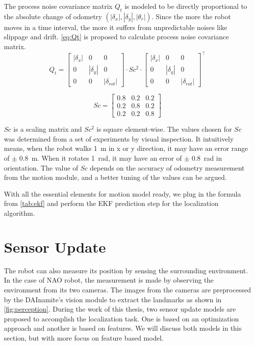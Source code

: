 The process noise covariance matrix $Q_t$ is modeled to be directly proportional to the absolute change of odometry $(|\delta_{x}|, |\delta_{y}|, |\theta_{r}|)$. Since the more the robot moves in a time interval, the more it suffers from unpredictable noises like slippage and drift. \autoref{eq:Qt} is proposed to calculate process noise covariance matrix.
\begin{equation}\label{eq:Qt} 
Q_t = 
\begin{bmatrix}
|\delta_x| & 0 & 0\\ 
0 &  |\delta_y|& 0\\ 
0 & 0 & |\delta_{rot}|
\end{bmatrix} 
\cdot
Sc^2 
\cdot
\begin{bmatrix}
|\delta_x| & 0 & 0\\ 
0 &  |\delta_y|& 0\\ 
0 & 0 & |\delta_{rot}|
\end{bmatrix}^\top
\end{equation}

\begin{equation}\label{eq:Sc} 
Sc = \begin{bmatrix}
0.8 & 0.2 & 0.2\\ 
0.2 &  0.8 & 0.2\\ 
0.2 & 0.2 & 0.8
\end{bmatrix}
\end{equation}

$Sc$ is a scaling matrix and $Sc^2$ is square element-wise. The values chosen for $Sc$ was determined from a set of experiments by visual inspection. It intuitively means, when the robot walks \SI{1}{\meter} in x or y direction, it may have an error range of $\pm$ \SI{0.8}{\meter}. When it rotates \SI{1}{\radian}, it may have an error of $\pm$ \SI{0.8}{\radian} in orientation. The value of $Sc$ depends on the accuracy of odometry measurement from the motion module, and a better tuning of the values can be argued.

With all the essential elements for motion model ready, we plug in the formula from \autoref{tab:ekf} and perform the \gls{EKF} prediction step for the localization algorithm. %



\section{Sensor Update}\label{sec:sensor update}
The robot can also measure its position by sensing the surrounding environment. In the case of NAO robot, the measurement is made by observing the environment from its two cameras. The images from the cameras are preprocessed by the DAInamite's vision module to extract the landmarks as shown in \autoref{fig:perception}. During the work of this thesis, two sensor update models are proposed to accomplish the localization task. One is based on an optimization approach and another is based on features. We will discuss both models in this section, but with more focus on feature based model.

